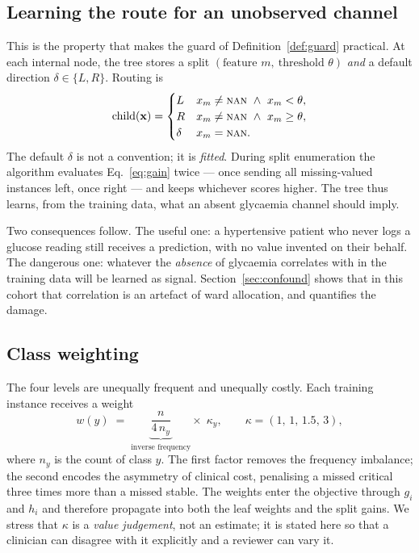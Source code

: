 \documentclass[11pt,a4paper]{article}
\begin{document}
\subsection{Learning the route for an unobserved channel}
\label{sec:nan}

This is the property that makes the guard of Definition~\ref{def:guard} practical.
At each internal node, the tree stores a split $(\text{feature } m,\ \text{threshold } \theta)$
\emph{and} a default direction $\delta\in\{L,R\}$. Routing is
\[
  \text{child}(\mathbf{x}) =
  \begin{cases}
    L & x_m \ne \textsc{nan} \ \wedge\ x_m < \theta,\\
    R & x_m \ne \textsc{nan} \ \wedge\ x_m \ge \theta,\\
    \delta & x_m = \textsc{nan}.
  \end{cases}
\]
The default $\delta$ is not a convention; it is \emph{fitted}. During split
enumeration the algorithm evaluates Eq.~\eqref{eq:gain} twice --- once sending all
missing-valued instances left, once right --- and keeps whichever scores higher.
The tree thus learns, from the training data, what an absent glycaemia channel
should imply.

Two consequences follow. The useful one: a hypertensive patient who never logs a
glucose reading still receives a prediction, with no value invented on their
behalf. The dangerous one: whatever the \emph{absence} of glycaemia correlates with
in the training data will be learned as signal. Section~\ref{sec:confound} shows
that in this cohort that correlation is an artefact of ward allocation, and
quantifies the damage.

\subsection{Class weighting}

The four levels are unequally frequent and unequally costly. Each training instance
receives a weight
\begin{equation}
\label{eq:weights}
  w(y) \;=\; \underbrace{\frac{n}{4\,n_y}}_{\text{inverse frequency}} \times\;
  \kappa_y, \qquad
  \kappa = (1,\,1,\,1.5,\,3) ,
\end{equation}
where $n_y$ is the count of class $y$. The first factor removes the frequency
imbalance; the second encodes the asymmetry of clinical cost, penalising a missed
\textsf{critical} three times more than a missed \textsf{stable}. The weights enter
the objective through $g_i$ and $h_i$ and therefore propagate into both the leaf
weights and the split gains. We stress that $\kappa$ is a \emph{value judgement},
not an estimate; it is stated here so that a clinician can disagree with it
explicitly and a reviewer can vary it.
\end{document}
